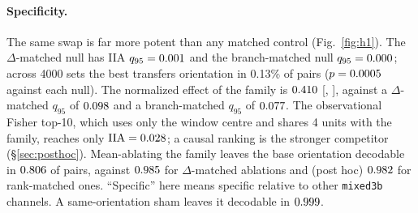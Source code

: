 \documentclass[11pt]{article}
\newcommand{\iia}{\mathrm{IIA}}
\begin{document}
\paragraph{Specificity.}
The same swap is far more potent than any matched control (Fig.~\ref{fig:h1}). The $\Delta$-matched null has IIA $q_{95}=0.001$ and the branch-matched null $q_{95}=0.000$; across 4000 sets the best transfers orientation in 0.13\% of pairs ($p=0.0005$ against each null). The normalized effect of the family is $0.410$ [\HOneEffLo, \HOneEffHi], against a $\Delta$-matched $q_{95}$ of $0.098$ and a branch-matched $q_{95}$ of $0.077$. The observational Fisher top-10, which uses only the window centre and shares 4 units with the family, reaches only $\iia=\HOneFisher$; a causal ranking is the stronger competitor (\S\ref{sec:posthoc}). Mean-ablating the family leaves the base orientation decodable in $0.806$ of pairs, against $0.985$ for $\Delta$-matched ablations and (post hoc) $0.982$ for rank-matched ones. ``Specific'' here means specific relative to other \texttt{mixed3b} channels. A same-orientation sham leaves it decodable in $0.999$.
\end{document}
